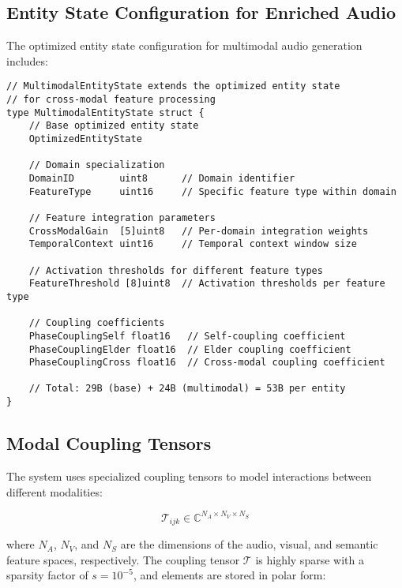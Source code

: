 \subsection{Entity State Configuration for Enriched Audio}

The optimized entity state configuration for multimodal audio generation includes:

\begin{tcolorbox}[colback=CodeBackground, colframe=DarkGray, title=Extended Entity State for Multimodal Processing, fonttitle=\bfseries]
\begin{verbatim}
// MultimodalEntityState extends the optimized entity state
// for cross-modal feature processing
type MultimodalEntityState struct {
    // Base optimized entity state
    OptimizedEntityState
    
    // Domain specialization
    DomainID        uint8      // Domain identifier
    FeatureType     uint16     // Specific feature type within domain
    
    // Feature integration parameters
    CrossModalGain  [5]uint8   // Per-domain integration weights
    TemporalContext uint16     // Temporal context window size
    
    // Activation thresholds for different feature types
    FeatureThreshold [8]uint8  // Activation thresholds per feature type
    
    // Coupling coefficients
    PhaseCouplingSelf float16   // Self-coupling coefficient
    PhaseCouplingElder float16  // Elder coupling coefficient
    PhaseCouplingCross float16  // Cross-modal coupling coefficient
    
    // Total: 29B (base) + 24B (multimodal) = 53B per entity
}
\end{verbatim}
\end{tcolorbox}

\subsection{Modal Coupling Tensors}

The system uses specialized coupling tensors to model interactions between different modalities:

\begin{equation}
\mathcal{T}_{ijk} \in \mathbb{C}^{N_A \times N_V \times N_S}
\end{equation}

where $N_A$, $N_V$, and $N_S$ are the dimensions of the audio, visual, and semantic feature spaces, respectively. The coupling tensor $\mathcal{T}$ is highly sparse with a sparsity factor of $s = 10^{-5}$, and elements are stored in polar form:

